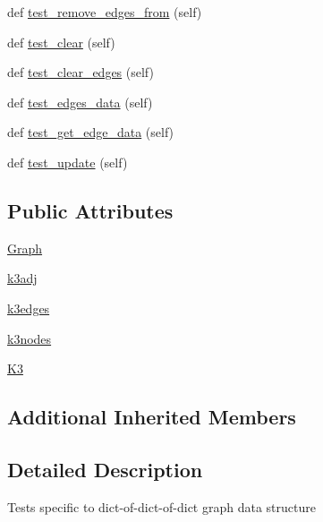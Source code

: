\begin{DoxyCompactItemize}
def \hyperlink{classnetworkx_1_1classes_1_1tests_1_1test__graph_1_1TestGraph_aa9045cefb1f0bfa8d30edb1953b714df}{test\+\_\+remove\+\_\+edges\+\_\+from} (self)
\item 
def \hyperlink{classnetworkx_1_1classes_1_1tests_1_1test__graph_1_1TestGraph_aacbd83f3508772538ef704be4379fd1e}{test\+\_\+clear} (self)
\item 
def \hyperlink{classnetworkx_1_1classes_1_1tests_1_1test__graph_1_1TestGraph_a11359e5d8ee7ef43e9967e61cb7fd9a1}{test\+\_\+clear\+\_\+edges} (self)
\item 
def \hyperlink{classnetworkx_1_1classes_1_1tests_1_1test__graph_1_1TestGraph_a5d3b2f9fa81e724966ea1bca2532ac46}{test\+\_\+edges\+\_\+data} (self)
\item 
def \hyperlink{classnetworkx_1_1classes_1_1tests_1_1test__graph_1_1TestGraph_a5c455a502881ced5cfe5b70b657f36e4}{test\+\_\+get\+\_\+edge\+\_\+data} (self)
\item 
def \hyperlink{classnetworkx_1_1classes_1_1tests_1_1test__graph_1_1TestGraph_a030a286e3d0748182b03ea5a285204d3}{test\+\_\+update} (self)
\end{DoxyCompactItemize}
\subsection*{Public Attributes}
\begin{DoxyCompactItemize}
\item 
\hyperlink{classnetworkx_1_1classes_1_1tests_1_1test__graph_1_1TestGraph_a6b9c83ff7cb2d633ae7cc08efd9ad72a}{Graph}
\item 
\hyperlink{classnetworkx_1_1classes_1_1tests_1_1test__graph_1_1TestGraph_a592e7b8acd9815a8ca2ed4b7f2e79fe6}{k3adj}
\item 
\hyperlink{classnetworkx_1_1classes_1_1tests_1_1test__graph_1_1TestGraph_a56ccedbd518932e951c7ee0a825f16d9}{k3edges}
\item 
\hyperlink{classnetworkx_1_1classes_1_1tests_1_1test__graph_1_1TestGraph_a27224e209b9458083f2ecb863e225ea9}{k3nodes}
\item 
\hyperlink{classnetworkx_1_1classes_1_1tests_1_1test__graph_1_1TestGraph_ad58fe09a4a1d9a46a9b5de70389c6fb0}{K3}
\end{DoxyCompactItemize}
\subsection*{Additional Inherited Members}


\subsection{Detailed Description}
\begin{DoxyVerb}Tests specific to dict-of-dict-of-dict graph data structure\end{DoxyVerb}
 

